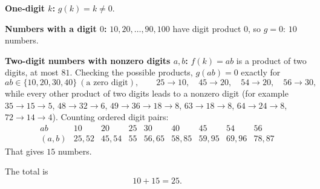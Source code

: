\textbf{One-digit $k$:} $g(k)=k\ne0$.

\textbf{Numbers with a digit $0$:} $10,20,\dots,90,100$ have digit product $0$, so $g=0$: $10$ numbers.

\textbf{Two-digit numbers with nonzero digits $a,b$:} $f(k)=ab$ is a product of two digits, at most $81$. Checking the possible products, $g(ab)=0$ exactly for
\[
ab\in\{10,20,30,40\}\ (\text{a zero digit}),\qquad 25\to10,\quad 45\to20,\quad 54\to20,\quad 56\to30,
\]
while every other product of two digits leads to a nonzero digit (for example $35\to15\to5$, $48\to32\to6$, $49\to36\to18\to8$, $63\to18\to8$, $64\to24\to8$, $72\to14\to4$). Counting ordered digit pairs:
\[
\begin{array}{c|cccccccc}
ab & 10 & 20 & 25 & 30 & 40 & 45 & 54 & 56\\\hline
(a,b) & 25,52 & 45,54 & 55 & 56,65 & 58,85 & 59,95 & 69,96 & 78,87
\end{array}
\]
That gives $15$ numbers.

The total is
\[10+15=\boxed{25}.\]
